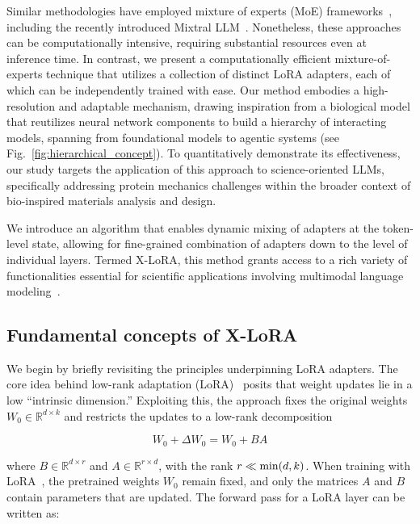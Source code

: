 Similar methodologies have employed mixture of experts (MoE) frameworks~\cite{Jacobs1991AdaptiveExperts,Hampshire1992TheRecognition,Jordan1994HierarchicalAlgorithm}, including the recently introduced Mixtral LLM~\cite{Jiang2024MixtralExperts}. Nonetheless, these approaches can be computationally intensive, requiring substantial resources even at inference time. In contrast, we present a computationally efficient mixture-of-experts technique that utilizes a collection of distinct LoRA adapters, each of which can be independently trained with ease. Our method embodies a high-resolution and adaptable mechanism, drawing inspiration from a biological model that reutilizes neural network components to build a hierarchy of interacting models, spanning from foundational models to agentic systems (see Fig.~\ref{fig:hierarchical_concept}). To quantitatively demonstrate its effectiveness, our study targets the application of this approach to science-oriented LLMs, specifically addressing protein mechanics challenges within the broader context of bio-inspired materials analysis and design.

We introduce an algorithm that enables dynamic mixing of adapters at the token-level state, allowing for fine-grained combination of adapters down to the level of individual layers. Termed X-LoRA, this method grants access to a rich variety of functionalities essential for scientific applications involving multimodal language modeling~\cite{Hu2023DeepScience,Buehler2023AMetamaterials,Buehler2022ProteinNetworks}.

\subsection{Fundamental concepts of X-LoRA}

We begin by briefly revisiting the principles underpinning LoRA adapters. The core idea behind low-rank adaptation (LoRA)~\cite{hu2021lora} posits that weight updates lie in a low “intrinsic dimension.” Exploiting this, the approach fixes the original weights $W_0 \in \mathbb{R}^{d \times k}$ and restricts the updates to a low-rank decomposition

\begin{equation}
W_0 + \Delta W_0 = W_0 + BA 
\end{equation}

where $B \in \mathbb{R}^{d \times r}$ and $A \in \mathbb{R}^{r \times d}$, with the rank $r \ll {\rm min}(d,k)$. When training with LoRA~\cite{hu2021lora}, the pretrained weights $W_0$ remain fixed, and only the matrices $A$ and $B$ contain parameters that are updated. The forward pass for a LoRA layer can be written as:


